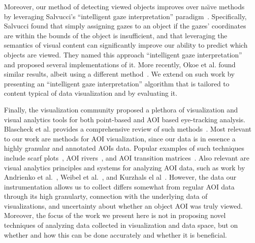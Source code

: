 Moreover, our method of detecting viewed objects improves over na\"{\i}ve methods by leveraging Salvucci's ``intelligent gaze interpretation'' paradigm~\cite{salvucci1999inferring,salvucci2000intelligent}. Specifically, Salvucci found that simply assigning gazes to an object if the gazes' coordinates are within the bounds of the object is insufficient, and that leveraging the semantics of visual content can significantly improve our ability to predict which objects are viewed. They named this approach ``intelligent gaze interpretation'' and proposed several implementations of it. More recently, Okoe et al. found similar results, albeit using a different method~\cite{okoe2014gaze,okoe2using}. We extend on such work by presenting an ``intelligent gaze interpretation'' algorithm that is tailored to content typical of data visualization and by evaluating it.
 
Finally, the visualization community proposed a plethora of visualization and visual analytics tools for both point-based and AOI based eye-tracking analysis. Blascheck et al. provides a comprehensive review of such methods~\cite{blascheckstate}. Most relevant to our work are methods for AOI visualization, since our data is in essence a highly granular and annotated AOIs data. Popular examples of such techniques include scarf plots~\cite{richardson2005looking}, AOI rivers~\cite{burch2013aoi}, and AOI transition matrices~\cite{goldberg1999computer}. Also relevant are visual analytics principles and systems for analyzing AOI data, such as work by Andrienko et al.~\cite{andrienko2012visual}, Weibel et al.~\cite{weibel2012let}, and Kurzhals el al~\cite{kurzhals2014iseecube}. However, the data our instrumentation allows us to collect differs somewhat from regular AOI data through its high granularty, connection with the underlying data of visualizations, and uncertainty about whether an object AOI was truly viewed. Moreover, the focus of the work we present here is not in proposing novel techniques of analyzing data collected in visualization and data space, but on whether and how this can be done accurately and whether it is beneficial.

